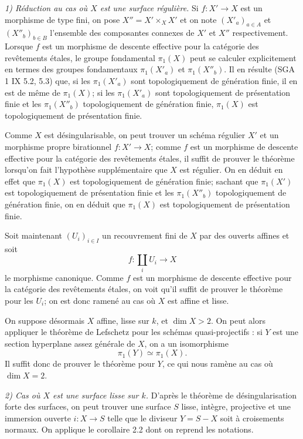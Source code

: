 \documentclass[11pt]{article}
\begin{document}
\emph{1) Réduction au cas où $X$ est une surface régulière.} Si $f:X'\to X$ est un morphisme de type fini, on pose $X''=X'\times_X X'$ et on note $(X'_a)_{a\in A}$ et $(X''_b)_{b\in B}$ l'ensemble des composantes connexes de $X'$ et $X''$ respectivement. Lorsque $f$ est un morphisme de descente effective pour la catégorie des revêtements étales, le groupe fondamental $\pi_1(X)$ peut se calculer explicitement en termes des groupes fondamentaux $\pi_1(X'_a)$ et $\pi_1(X''_b)$. Il en résulte (SGA 1 IX 5.2, 5.3) que, si les $\pi_1(X'_a)$ sont topologiquement de génération finie, il en est de même de $\pi_1(X)$; si les $\pi_1(X'_a)$ sont topologiquement de présentation finie et les $\pi_1(X''_b)$ topologiquement de génération finie, $\pi_1(X)$ est topologiquement de présentation finie.

Comme $X$ est désingularisable, on peut trouver un schéma régulier $X'$ et un morphisme propre birationnel $f:X'\to X$; comme $f$ est un morphisme de descente effective pour la catégorie des revêtements étales, il suffit de prouver le théorème lorsqu'on fait l'hypothèse supplémentaire que $X$ est régulier. On en déduit en effet que $\pi_1(X)$ est topologiquement de génération finie; sachant que $\pi_1(X')$ est topologiquement de présentation finie et les $\pi_1(X''_b)$ topologiquement de génération finie, on en déduit que $\pi_1(X)$ est topologiquement de présentation finie.

Soit maintenant $(U_i)_{i\in I}$ un recouvrement fini de $X$ par des ouverts affines et soit
\[
 f:\coprod_i U_i\longrightarrow X
\]
le morphisme canonique. Comme $f$ est un morphisme de descente effective pour la catégorie des revêtements étales, on voit qu'il suffit de prouver le théorème pour les $U_i$; on est donc ramené au cas où $X$ est affine et lisse.

On suppose désormais $X$ affine, lisse sur $k$, et $\dim X>2$. On peut alors appliquer le théorème de Lefschetz pour les schémas quasi-projectifs : si $Y$ est une section hyperplane assez générale de $X$, on a un isomorphisme
\[
 \pi_1(Y)\simeq \pi_1(X).
\]
Il suffit donc de prouver le théorème pour $Y$, ce qui nous ramène au cas où $\dim X=2$.

\emph{2) Cas où $X$ est une surface lisse sur $k$.} D'après le théorème de désingularisation forte des surfaces, on peut trouver une surface $S$ lisse, intègre, projective et une immersion ouverte $i:X\to S$ telle que le diviseur $Y=S-X$ soit à croisements normaux. On applique le corollaire 2.2 dont on reprend les notations.
\end{document}
